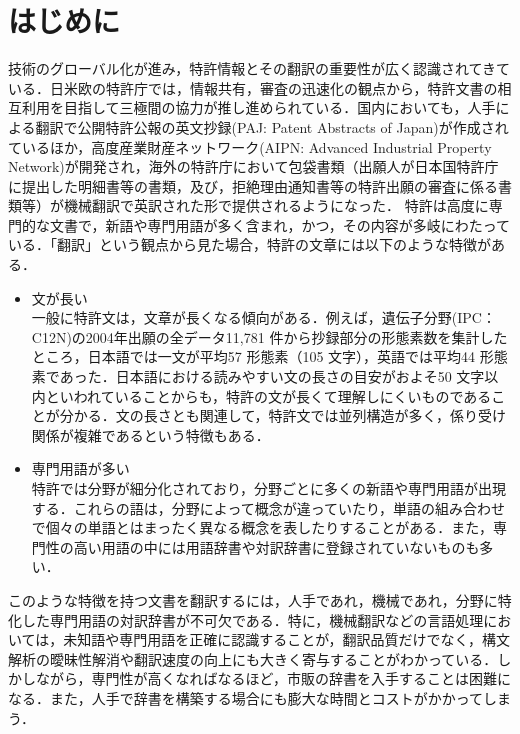 \documentclass[japanese]{jnlp_1.3e}
\begin{document}
\maketitle

\section{はじめに}
技術のグローバル化が進み，特許情報とその翻訳の重要性が広く認識されてきている．日米欧の特許庁では，情報共有，審査の迅速化の観点から，特許文書の相互利用を目指して三極間の協力が推し進められている．国内においても，人手による翻訳で公開特許公報の英文抄録(PAJ: Patent Abstracts of Japan)が作成されているほか，高度産業財産ネットワーク(AIPN: Advanced Industrial Property Network)が開発され，海外の特許庁において包袋書類（出願人が日本国特許庁に提出した明細書等の書類，及び，拒絶理由通知書等の特許出願の審査に係る書類等）が機械翻訳で英訳された形で提供されるようになった．
特許は高度に専門的な文書で，新語や専門用語が多く含まれ，かつ，その内容が多岐にわたっている．「翻訳」という観点から見た場合，特許の文章には以下のような特徴がある．

\begin{itemize}
\item 文が長い\\
一般に特許文は，文章が長くなる傾向がある．例えば，遺伝子分野(IPC：C12N)の2004年出願の全データ11,781 件から抄録部分の形態素数を集計したところ，日本語では一文が平均57 形態素（105 文字），英語では平均44 形態素であった．日本語における読みやすい文の長さの目安がおよそ50 文字以内といわれていることからも，特許の文が長くて理解しにくいものであることが分かる．文の長さとも関連して，特許文では並列構造が多く，係り受け関係が複雑であるという特徴もある．
\item 専門用語が多い\\
特許では分野が細分化されており，分野ごとに多くの新語や専門用語が出現する．これらの語は，分野によって概念が違っていたり，単語の組み合わせで個々の単語とはまったく異なる概念を表したりすることがある．また，専門性の高い用語の中には用語辞書や対訳辞書に登録されていないものも多い．
\end{itemize}

このような特徴を持つ文書を翻訳するには，人手であれ，機械であれ，分野に特化した専門用語の対訳辞書が不可欠である．特に，機械翻訳などの言語処理においては，未知語や専門用語を正確に認識することが，翻訳品質だけでなく，構文解析の曖昧性解消や翻訳速度の向上にも大きく寄与することがわかっている\cite{Shimohata05}．しかしながら，専門性が高くなればなるほど，市販の辞書を入手することは困難になる．また，人手で辞書を構築する場合にも膨大な時間とコストがかかってしまう．
\end{document}
